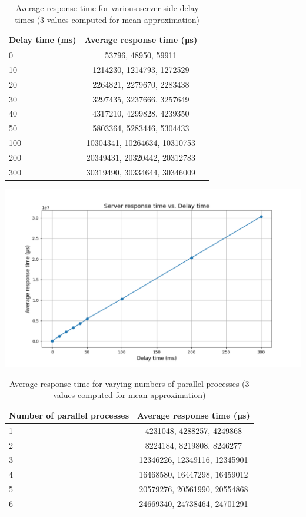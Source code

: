 \documentclass[a4paper, 11pt]{article}
\begin{document}
\begin{table}[h]
\centering
\begin{tabular}{lcc}
Delay time (ms) & Average response time (µs) \\\hline
0 & 53796, 48950, 59911 \\\hline
10 & 1214230, 1214793, 1272529 \\\hline
20 & 2264821, 2279670, 2283438 \\\hline
30 & 3297435, 3237666, 3257649 \\\hline
40 & 4317210, 4299828, 4239350 \\\hline
50 & 5803364, 5283446, 5304433 \\\hline
100 & 10304341, 10264634, 10310753 \\\hline
200 & 20349431, 20320442, 20312783 \\\hline
300 & 30319490, 30334644, 30346009 \\\hline
\end{tabular}
\caption{
    Average response time for various server-side delay times (3 values computed for mean approximation)}
\label{tab:results}
\end{table}


\begin{center}
    \includegraphics[scale=0.5]{result_single.pdf}
\end{center}

\begin{table}[h]
\centering
\begin{tabular}{lc}
Number of parallel processes & Average response time (µs) \\\hline
1 & 4231048, 4288257, 4249868 \\\hline
2 & 8224184, 8219808, 8246277 \\\hline
3 & 12346226, 12349116, 12345901 \\\hline
4 & 16468580, 16447298, 16459012 \\\hline
5 & 20579276, 20561990, 20554868 \\\hline
6 & 24669340, 24738464, 24701291 \\\hline
\end{tabular}
\caption{Average response time for varying numbers of parallel processes (3 values computed for mean approximation)}
\label{tab:parallel_results}
\end{table}
\end{document}
